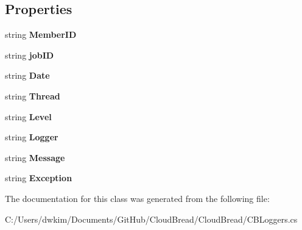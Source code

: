 \subsection*{Properties}
\begin{DoxyCompactItemize}
\item 
string {\bfseries Member\+ID}\hypertarget{a00025_acba8c4b88f5a381cd7f4e3acfa56edd6}{}\label{a00025_acba8c4b88f5a381cd7f4e3acfa56edd6}

\item 
string {\bfseries job\+ID}\hypertarget{a00025_aee100ffe77cdb964c4002d1f2e229bd2}{}\label{a00025_aee100ffe77cdb964c4002d1f2e229bd2}

\item 
string {\bfseries Date}\hypertarget{a00025_a2d917c830b31005ac51b530109e33b66}{}\label{a00025_a2d917c830b31005ac51b530109e33b66}

\item 
string {\bfseries Thread}\hypertarget{a00025_a4d4c6359cff9e8631183abf0cb267f15}{}\label{a00025_a4d4c6359cff9e8631183abf0cb267f15}

\item 
string {\bfseries Level}\hypertarget{a00025_a1957596f9395466b256ca722caf6813a}{}\label{a00025_a1957596f9395466b256ca722caf6813a}

\item 
string {\bfseries Logger}\hypertarget{a00025_ae3b97b03e15a25180bcf50b06d895600}{}\label{a00025_ae3b97b03e15a25180bcf50b06d895600}

\item 
string {\bfseries Message}\hypertarget{a00025_a65f69f9379e62a38db0c806317e40042}{}\label{a00025_a65f69f9379e62a38db0c806317e40042}

\item 
string {\bfseries Exception}\hypertarget{a00025_a83734575c9e288cd515dbc9165370a0a}{}\label{a00025_a83734575c9e288cd515dbc9165370a0a}

\end{DoxyCompactItemize}


The documentation for this class was generated from the following file\+:\begin{DoxyCompactItemize}
\item 
C\+:/\+Users/dwkim/\+Documents/\+Git\+Hub/\+Cloud\+Bread/\+Cloud\+Bread/C\+B\+Loggers.\+cs\end{DoxyCompactItemize}
